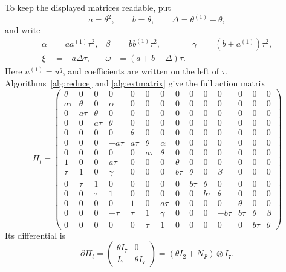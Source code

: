 To keep the displayed matrices readable, put
\[
 a=\theta^2,\qquad b=\theta,\qquad
 \Delta=\theta^{(1)}-\theta,
\]
and write
\begin{equation}
\begin{aligned}
 \alpha&=a a^{(1)}\tau^2,
 &\beta&=b b^{(1)}\tau^2,
 &\gamma&=(b+a^{(1)})\tau^2,\\
 \xi&=-a\Delta\tau,
 &\omega&=(a+b-\Delta)\tau.
\end{aligned}
 \label{eq:large-entry-notation}
\end{equation}
Here $u^{(1)}=u^q$, and coefficients are written on the
left of $\tau$. Algorithms~\ref{alg:reduce} and
\ref{alg:extmatrix} give the full action matrix
\begingroup
\setlength{\arraycolsep}{2pt}
\begin{equation}
 \Pi_t=
\begin{pmatrix}
  \theta & 0 & 0 & 0 & 0 & 0 & 0 & 0 & 0 & 0 & 0 & 0 & 0 & 0\\
  a\tau & \theta & 0 & \alpha & 0 & 0 & 0 & 0 & 0 & 0 & 0 & 0 & 0 & 0\\
  0 & a\tau & \theta & 0 & 0 & 0 & 0 & 0 & 0 & 0 & 0 & 0 & 0 & 0\\
  0 & 0 & a\tau & \theta & 0 & 0 & 0 & 0 & 0 & 0 & 0 & 0 & 0 & 0\\
  0 & 0 & 0 & 0 & \theta & 0 & 0 & 0 & 0 & 0 & 0 & 0 & 0 & 0\\
  0 & 0 & 0 & -a\tau & a\tau & \theta & \alpha & 0 & 0 & 0 & 0 & 0 & 0 & 0\\
  0 & 0 & 0 & 0 & 0 & a\tau & \theta & 0 & 0 & 0 & 0 & 0 & 0 & 0\\
  1 & 0 & 0 & a\tau & 0 & 0 & 0 & \theta & 0 & 0 & 0 & 0 & 0 & 0\\
  \tau & 1 & 0 & \gamma & 0 & 0 & 0 & b\tau & \theta & 0 & \beta & 0 & 0 & 0\\
  0 & \tau & 1 & 0 & 0 & 0 & 0 & 0 & b\tau & \theta & 0 & 0 & 0 & 0\\
  0 & 0 & \tau & 1 & 0 & 0 & 0 & 0 & 0 & b\tau & \theta & 0 & 0 & 0\\
  0 & 0 & 0 & 0 & 1 & 0 & a\tau & 0 & 0 & 0 & 0 & \theta & 0 & 0\\
  0 & 0 & 0 & -\tau & \tau & 1 & \gamma & 0 & 0 & 0 & -b\tau & b\tau & \theta & \beta\\
  0 & 0 & 0 & 0 & 0 & \tau & 1 & 0 & 0 & 0 & 0 & 0 & b\tau & \theta
 \end{pmatrix}
 \label{eq:large-full-action}
\end{equation}
\endgroup
Its differential is
\[
 \partial\Pi_t=
 \begin{pmatrix}\theta I_7&0\\I_7&\theta I_7\end{pmatrix}
 = (\theta I_2+N_\Psi)\otimes I_7.
\]

